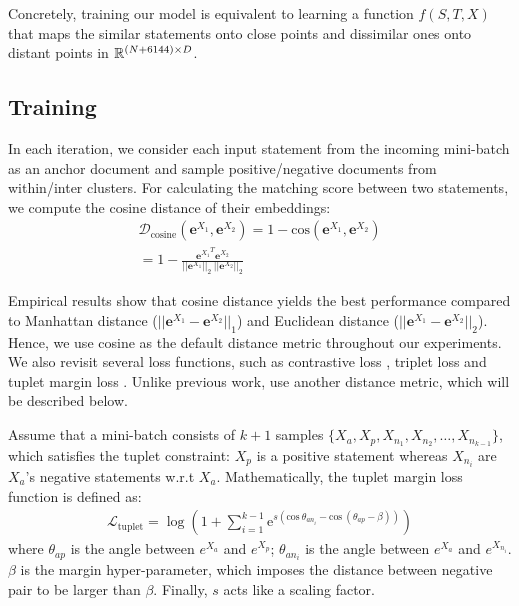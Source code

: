 Concretely, training our model is equivalent to learning a function $f(S,T,X)$ that maps the similar statements onto close points and dissimilar ones onto distant points in $\mathbb{R}^{ (N+6144) \times D}$.

\subsection{Training}
\label{sec:training}
In each iteration, we consider each input statement from the incoming mini-batch as an anchor document and sample positive/negative documents from within/inter clusters. For calculating the matching score between two statements, we compute the cosine distance of their embeddings:
\begin{align}
\mathcal{D}_{\mathrm{cosine}}(\mathbf{e}^{X_1}, \mathbf{e}^{X_2}) =
1 - \mathrm{cos}(\mathbf{e}^{X_1}, \mathbf{e}^{X_2}) \label{eq:cosine}\\
= 1 - \frac{{\mathbf{e}^{X_1}}^T \mathbf{e}^{X_2}}
{||\mathbf{e}^{X_1}||_2 \: ||\mathbf{e}^{X_2}||_2} \nonumber
\end{align}

Empirical results show that cosine distance yields the best performance compared to Manhattan distance ($||\mathbf{e}^{X_1} - \mathbf{e}^{X_2}||_1$) and Euclidean distance ($||\mathbf{e}^{X_1} - \mathbf{e}^{X_2}||_2$). Hence, we use cosine as the default distance metric throughout our experiments. We also revisit several loss functions, such as contrastive loss \citep{chopra2005learning}, triplet loss \citep{dong2018triplet} and tuplet margin loss \citep{yu2019deep}. Unlike previous work, \citet{yu2019deep} use another distance metric, which will be described below.

Assume that a mini-batch consists of $k+1$ samples $\{X_a, X_p, X_{n_{1}},X_{n_{2}}, \dots, X_{n_{k-1}}\}$, which satisfies the tuplet constraint: $X_p$ is a positive statement whereas $X_{n_i}$ are $X_a$'s negative statements w.r.t $X_a$. Mathematically, the tuplet margin loss function is defined as:
\begin{align*}
\mathcal{L}_{\text{tuplet}} = \log(1 + \sum_{i=1}^{k-1} 
\mathrm{e}^{s(\mathrm{cos}\:\theta_{an_i} - \mathrm{cos}\:(\theta_{ap}-\beta))} )
\end{align*}
where  $\theta_{ap}$ is the angle between $e^{X_a}$ and $e^{X_p}$;\; $\theta_{an_i}$ is the angle between $e^{X_a}$ and $e^{X_{n_{i}}}$. $\beta$ is the margin hyper-parameter, which imposes the distance between negative pair to be larger than $\beta$. Finally, $s$ acts like a scaling factor.

